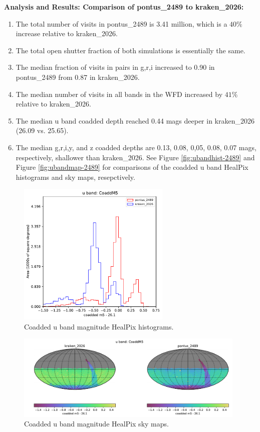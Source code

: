\documentclass[DM,lsstdraft,authoryear,toc]{lsstdoc}
\begin{document}
\textbf{Analysis and Results: Comparison of pontus\_2489 to kraken\_2026:}

\begin{enumerate}
\item The total number of visits in pontus\_2489 is 3.41 million, which is a $40\%$ increase relative to kraken\_2026.
\item The total open shutter fraction of both simulations is essentially the same.
\item The median fraction of visits in pairs in g,r,i increased to 0.90 in pontus\_2489 from 0.87 in kraken\_2026.
\item The median number of visits in all bands in the WFD increased by $41\%$ relative to kraken\_2026.
\item The median u band coadded depth reached 0.44 mags deeper in kraken\_2026 (26.09 vs. 25.65). 
\item  The median g,r,i,y, and z coadded depths are 0.13, 0.08, 0,05, 0.08, 0.07 mags, respectively, shallower than kraken\_2026.
See Figure  \autoref{fig:ubandhist-2489} and Figure  \autoref{fig:ubandmap-2489} for comparisons of the coadded u band
HealPix histograms and sky maps, resepctively.
\end{enumerate}

\begin{figure}[ht]
\centering
\includegraphics[width=0.65\textwidth]{figures/pontus_2489_kraken_2026_CoaddM5_u_band_HEAL_ComboHistogram.pdf}
\caption{Coadded u band magnitude HealPix histograms.}
\label{fig:ubandhist-2489}
\end{figure}

\begin{figure}[ht]
\centering
\includegraphics[width=0.98\textwidth]{figures/pontus_2489_kraken_2026_CoaddM5_u_band_HEAL_ComboSkyMap.pdf} 
\caption{Coadded u band magnitude HealPix sky maps.}
\label{fig:ubandmap-2489}
\end{figure}
\end{document}
